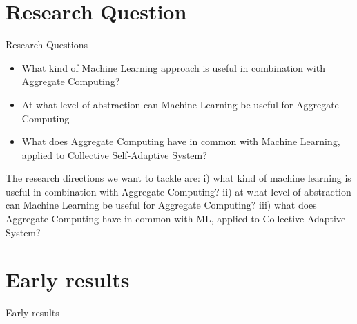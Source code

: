 \documentclass[aspectratio=169]{beamer}
\begin{document}
\section{Research Question}
\begin{frame}{Research Questions}
  \begin{card}
    \begin{itemize}
      \item <1-> What kind of Machine Learning approach is useful in combination with Aggregate Computing?
      \item <2-> At what level of abstraction can Machine Learning be useful for Aggregate Computing
      \item <3-> What does Aggregate Computing have in common with Machine Learning, applied to Collective Self-Adaptive System?
    \end{itemize}  
  \end{card}
  \pdfcomment 
  {
    The research directions we want to tackle are: 
    i) what kind of machine learning is useful in combination with Aggregate Computing? 
    ii) at what level of abstraction can Machine Learning be useful for Aggregate Computing? 
    iii) what does Aggregate Computing have in common with ML, applied to Collective Adaptive System?
  }
\end{frame}
\section{Early results}
\begin{frame}{Early results}
\end{frame}
\end{document}

